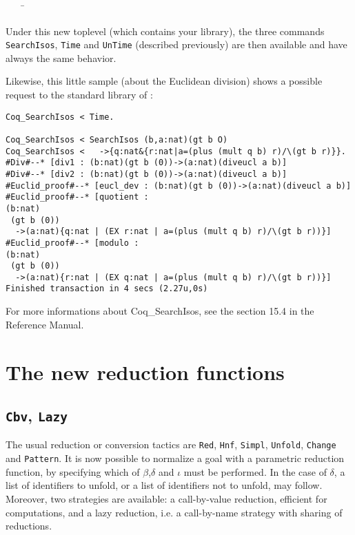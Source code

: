 \documentclass[11pt]{article}
\begin{document}
\begin{coq_example*}
\begin{tabbing}
\ \ \ \ \=\kill
{}
\end{tabbing}

Under this new toplevel (which contains your {\Coq} library), the three
commands {\tt SearchIsos}, {\tt Time} and {\tt UnTime} (described previously)
are then available and have always the same behavior.

Likewise, this little sample (about the Euclidean division) shows a possible
request to the standard library of {\Coq}:

\begin{verbatim}
Coq_SearchIsos < Time.

Coq_SearchIsos < SearchIsos (b,a:nat)(gt b O)
Coq_SearchIsos <   ->{q:nat&{r:nat|a=(plus (mult q b) r)/\(gt b r)}}.
#Div#--* [div1 : (b:nat)(gt b (0))->(a:nat)(diveucl a b)]
#Div#--* [div2 : (b:nat)(gt b (0))->(a:nat)(diveucl a b)]
#Euclid_proof#--* [eucl_dev : (b:nat)(gt b (0))->(a:nat)(diveucl a b)]
#Euclid_proof#--* [quotient : 
(b:nat)
 (gt b (0))
  ->(a:nat){q:nat | (EX r:nat | a=(plus (mult q b) r)/\(gt b r))}]
#Euclid_proof#--* [modulo : 
(b:nat)
 (gt b (0))
  ->(a:nat){r:nat | (EX q:nat | a=(plus (mult q b) r)/\(gt b r))}]
Finished transaction in 4 secs (2.27u,0s)
\end{verbatim}

For more informations about \textsf{Coq\_SearchIsos}, see the section 15.4 in
the Reference Manual.

\section{The new reduction functions} \label{reductions}

\subsection{\texttt{Cbv}, \texttt{Lazy}}
The usual reduction or conversion tactics are \verb!Red!, \verb!Hnf!,
\verb!Simpl!, \verb!Unfold!, \verb!Change! and \verb!Pattern!.  It is
now possible to normalize a goal with a parametric reduction function,
by specifying which of $\beta$,$\delta$ and $\iota$ must be
performed. In the case of $\delta$, a list of identifiers to unfold,
or a list of identifiers not to unfold, may follow. Moreover, two
strategies are available: a call-by-value reduction, efficient for
computations, and a lazy reduction, i.e. a call-by-name strategy with
sharing of reductions. 


\end{coq_example*}
\end{document}
